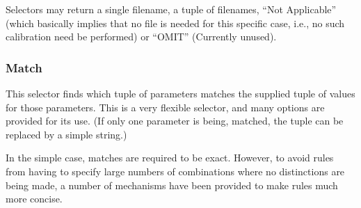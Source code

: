 \documentclass[final,authoryear,5p,times,twocolumn]{elsarticle}
\begin{document}
Selectors may return a single filename, a tuple of filenames,
``Not Applicable'' (which basically implies that no file is
needed for this specific case, i.e., no such calibration need be 
performed) or ``OMIT'' (Currently unused).

\subsubsection{Match}
This selector finds which tuple of parameters matches the supplied tuple
of values for those parameters. This is a very flexible selector, and 
many options are provided for its use. (If only one parameter is being,
matched, the tuple can be replaced by a simple string.)

In the simple case, matches are required to be exact. However, to avoid
rules from having to specify large numbers of combinations where no
distinctions are being made, a number of mechanisms have been provided
to make rules much more concise.
\end{document}
